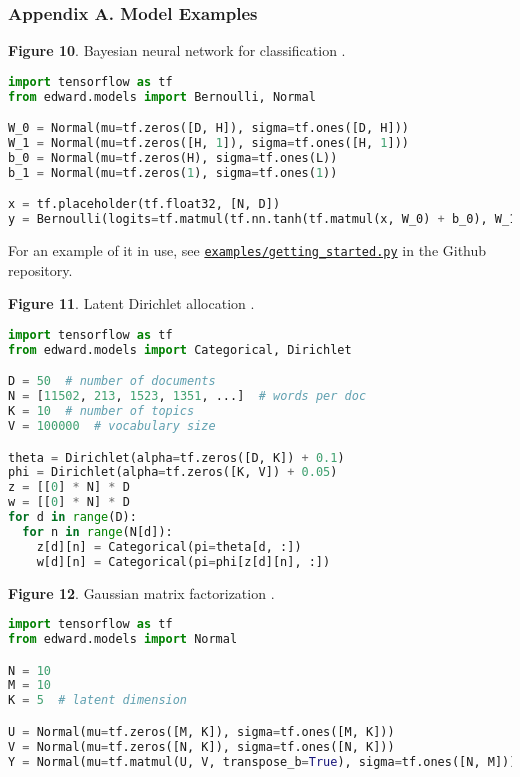 \subsubsection{Appendix A. Model Examples}

\textbf{Figure 10}. Bayesian neural network for classification \citep{denker1987large}.
\begin{lstlisting}[language=python]
import tensorflow as tf
from edward.models import Bernoulli, Normal

W_0 = Normal(mu=tf.zeros([D, H]), sigma=tf.ones([D, H]))
W_1 = Normal(mu=tf.zeros([H, 1]), sigma=tf.ones([H, 1]))
b_0 = Normal(mu=tf.zeros(H), sigma=tf.ones(L))
b_1 = Normal(mu=tf.zeros(1), sigma=tf.ones(1))

x = tf.placeholder(tf.float32, [N, D])
y = Bernoulli(logits=tf.matmul(tf.nn.tanh(tf.matmul(x, W_0) + b_0), W_1) + b_1)
\end{lstlisting}
For an example of it in use, see
\href{https://github.com/blei-lab/edward/blob/master/examples/getting_started.py}{\texttt{examples/getting_started.py}}
in the Github repository.

\textbf{Figure 11}. Latent Dirichlet allocation \citep{blei2003latent}.
\begin{lstlisting}[language=python]
import tensorflow as tf
from edward.models import Categorical, Dirichlet

D = 50  # number of documents
N = [11502, 213, 1523, 1351, ...]  # words per doc
K = 10  # number of topics
V = 100000  # vocabulary size

theta = Dirichlet(alpha=tf.zeros([D, K]) + 0.1)
phi = Dirichlet(alpha=tf.zeros([K, V]) + 0.05)
z = [[0] * N] * D
w = [[0] * N] * D
for d in range(D):
  for n in range(N[d]):
    z[d][n] = Categorical(pi=theta[d, :])
    w[d][n] = Categorical(pi=phi[z[d][n], :])
\end{lstlisting}

\textbf{Figure 12}. Gaussian matrix factorization
\citep{salakhutdinov2011probabilistic}.
\begin{lstlisting}[language=python]
import tensorflow as tf
from edward.models import Normal

N = 10
M = 10
K = 5  # latent dimension

U = Normal(mu=tf.zeros([M, K]), sigma=tf.ones([M, K]))
V = Normal(mu=tf.zeros([N, K]), sigma=tf.ones([N, K]))
Y = Normal(mu=tf.matmul(U, V, transpose_b=True), sigma=tf.ones([N, M]))
\end{lstlisting}

